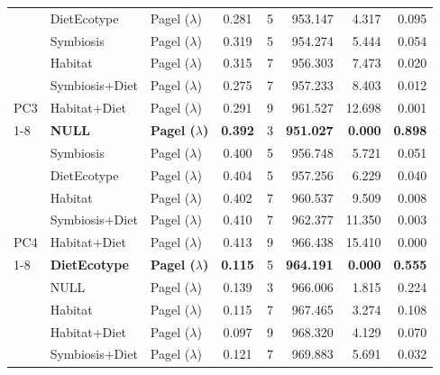 \begin{table}[!h]
\begin{tabular}[t]{lllccrrr}
 & DietEcotype & Pagel ($\lambda$) & 0.281 & 5 & 953.147 & 4.317 & 0.095\\

 & Symbiosis & Pagel ($\lambda$) & 0.319 & 5 & 954.274 & 5.444 & 0.054\\

 & Habitat & Pagel ($\lambda$) & 0.315 & 7 & 956.303 & 7.473 & 0.020\\

 & Symbiosis+Diet & Pagel ($\lambda$) & 0.275 & 7 & 957.233 & 8.403 & 0.012\\

\multirow{-6}{*}{\raggedright\arraybackslash PC3} & Habitat+Diet & Pagel ($\lambda$) & 0.291 & 9 & 961.527 & 12.698 & 0.001\\
\cmidrule{1-8}
 & \textbf{NULL} & \textbf{Pagel ($\lambda$)} & \textbf{0.392} & 3 & \textbf{951.027} & \textbf{0.000} & \textbf{0.898}\\

 & Symbiosis & Pagel ($\lambda$) & 0.400 & 5 & 956.748 & 5.721 & 0.051\\

 & DietEcotype & Pagel ($\lambda$) & 0.404 & 5 & 957.256 & 6.229 & 0.040\\

 & Habitat & Pagel ($\lambda$) & 0.402 & 7 & 960.537 & 9.509 & 0.008\\

 & Symbiosis+Diet & Pagel ($\lambda$) & 0.410 & 7 & 962.377 & 11.350 & 0.003\\

\multirow{-6}{*}{\raggedright\arraybackslash PC4} & Habitat+Diet & Pagel ($\lambda$) & 0.413 & 9 & 966.438 & 15.410 & 0.000\\
\cmidrule{1-8}
 & \textbf{DietEcotype} & \textbf{Pagel ($\lambda$)} & \textbf{0.115} & 5 & \textbf{964.191} & \textbf{0.000} & \textbf{0.555}\\

 & NULL & Pagel ($\lambda$) & 0.139 & 3 & 966.006 & 1.815 & 0.224\\

 & Habitat & Pagel ($\lambda$) & 0.115 & 7 & 967.465 & 3.274 & 0.108\\

 & Habitat+Diet & Pagel ($\lambda$) & 0.097 & 9 & 968.320 & 4.129 & 0.070\\

 & Symbiosis+Diet & Pagel ($\lambda$) & 0.121 & 7 & 969.883 & 5.691 & 0.032\\


\end{tabular}
\end{table}
